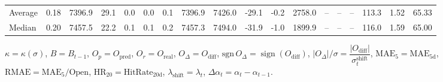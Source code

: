 \begin{threeparttable}
{\begin{tabular}{lrrrrrrrrrrrrrrrrr}
Average &     0.18 & 7396.9 &              29.1 &               0.0 &                0.0 &                0.1 & 7396.9 & 7426.0 &      -29.1 &                     -0.2 &              2758.0 &         -- &        -- &             -- &            113.3 &            1.52 &                  65.33 \\
 Median &     0.20 & 7457.5 &              22.2 &               0.1 &                0.1 &                0.2 & 7457.3 & 7494.0 &      -31.9 &                     -1.0 &              1899.9 &         -- &        -- &             -- &            116.0 &            1.59 &                  65.00 \\
\bottomrule
\end{tabular}
}
\begin{tablenotes}\footnotesize
\item $\kappa=\kappa(\sigma)$, $B=B_{t-1}$, $O_p=O_{\text{pred}}$, $O_r=O_{\text{real}}$, $O_\Delta=O_{\text{diff}}$, $\mathrm{sgn}\,O_\Delta=\operatorname{sign}(O_{\text{diff}})$, $|O_\Delta|/\sigma=\dfrac{|O_{\text{diff}}|}{\sigma_t^{\text{shift}}}$, $\mathrm{MAE}_5=\mathrm{MAE}_{5\text{d}}$, $\mathrm{RMAE}= \mathrm{MAE}_5 / \text{Open}$, $\mathrm{HR}_{20}=\mathrm{HitRate}_{20\text{d}}$, 
$\lambda_{\text{shift}}=\lambda_t$, 
$\Delta\alpha_t=\alpha_t-\alpha_{t-1}$.
\end{tablenotes}
\end{threeparttable}
\endgroup

